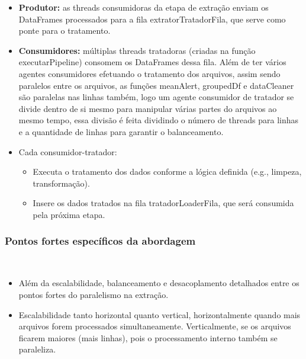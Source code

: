 \documentclass[a4paper,12pt]{article}
\begin{document}
\begin{itemize}
    \item \textbf{Produtor:} as threads consumidoras da etapa de extração enviam os DataFrames processados para a fila extratorTratadorFila, que serve como ponte para o tratamento. 

    \item \textbf{Consumidores:} múltiplas threads tratadoras (criadas na função executarPipeline) consomem os DataFrames dessa fila. Além de ter vários agentes consumidores efetuando o tratamento dos arquivos, assim sendo paralelos entre os arquivos, as funções meanAlert, groupedDf e dataCleaner são paralelas nas linhas também, logo um agente consumidor de tratador se divide dentro de si mesmo para manipular várias partes do arquivos ao mesmo tempo, essa divisão é feita dividindo o número de threads para linhas e a quantidade de linhas para garantir o balanceamento.

    \item Cada consumidor-tratador:
    \begin{itemize}
        \item Executa o tratamento dos dados conforme a lógica definida (e.g., limpeza, transformação).

        \item Insere os dados tratados na fila tratadorLoaderFila, que será consumida pela próxima etapa.
        
    \end{itemize}

\end{itemize}

\subsubsection*{Pontos fortes específicos da abordagem}
\\

\begin{itemize}
    \item Além da escalabilidade, balanceamento e desacoplamento detalhados entre os pontos fortes do paralelismo na extração.
    \item Escalabilidade tanto horizontal quanto vertical, horizontalmente quando mais arquivos forem processados simultaneamente. Verticalmente, se os arquivos ficarem maiores (mais linhas), pois o processamento interno também se paraleliza.


    
\end{itemize}
\end{document}
